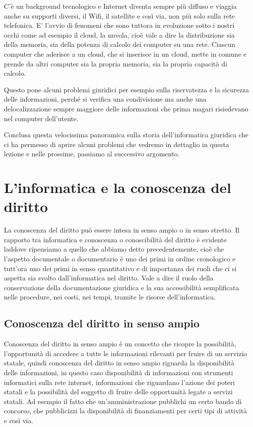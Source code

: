 C'è un background tecnologico e Internet diventa sempre più diffuso e viaggia anche su supporti diversi, il Wifi, il satellite e così via, non più solo sulla rete telefonica. E' l'avvio di fenomeni che sono tuttora in evoluzione sotto i nostri occhi come ad esempio il cloud, la nuvola, cioè vale a dire la distribuzione sia della memoria, sia della potenza di calcolo dei computer su una rete. Ciascun computer che aderisce a un cloud, che si inserisce in un cloud, mette in comune e prende da altri computer sia la propria memoria, sia la propria capacità di calcolo.\par 
Questo pone alcuni problemi giuridici per esempio sulla riservatezza e la sicurezza delle informazioni, perché si verifica una condivisione ma anche una delocalizzazione sempre maggiore delle informazioni che prima magari risiedevano nel computer dell'utente.\par 
Conclusa questa velocissima panoramica sulla storia dell'informatica giuridica che ci ha permesso di aprire alcuni problemi che vedremo in dettaglio in questa lezione e nelle prossime, passiamo al successivo argomento.

\section{L'informatica e la conoscenza del diritto}

La conoscenza del diritto può essere intesa in senso ampio o in senso stretto. Il rapporto tra informatica e conoscenza o conoscibilità del diritto è evidente laddove ripensiamo a quello che abbiamo detto precedentemente, cioè che l'aspetto documentale o documentario è uno dei primi in ordine cronologico e tutt'ora uno dei primi in senso quantitativo e di importanza dei ruoli che ci si aspetta sia svolto dall'informatica nel diritto. 
Vale a dire il ruolo della conservazione della documentazione giuridica e la sua accessibilità semplificata nelle procedure, nei costi, nei tempi, tramite le risorse dell'informatica.
\subsection{Conoscenza del diritto in senso ampio}
Conoscenza del diritto in senso ampio è un concetto che ricopre la possibilità, l'opportunità di accedere a tutte le informazioni rilevanti per fruire di un servizio statale, quindi conoscenza del diritto in senso ampio riguarda la disponibilità delle informazioni, in questo caso disponibilità di  informazioni con strumenti informatici sulla rete internet, informazioni che riguardano l'azione dei poteri statali e la possibilità del soggetto di fruire delle opportunità legate a servizi statali. Ad esempio il fatto che un'amministrazione pubblichi un certo bando di concorso, che pubblicizzi la disponibilità di finanziamenti per certi tipi di attività e così via. 
